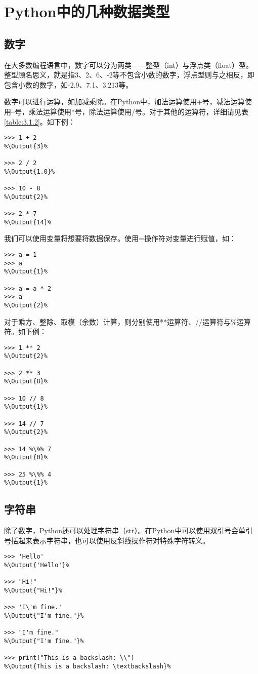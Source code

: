 \documentclass[../../Main.tex]{subfiles}
\begin{document}
\section{Python中的几种数据类型}
\subsection{数字}
在大多数编程语言中，数字可以分为两类——整型（int）与浮点类（float）型。整型顾名思义，就是指3、2、6、-2等不包含小数的数字，浮点型则与之相反，即包含小数的数字，如-2.9、7.1、3.213等。

数字可以进行运算，如加减乘除。在Python中，加法运算使用+号，减法运算使用--号，乘法运算使用*号，除法运算使用/号。对于其他的运算符，详细请见表\ref{table:3.1.2}。如下例：
\begin{lstlisting}
>>> 1 + 2
%\Output{3}%

>>> 2 / 2
%\Output{1.0}%

>>> 10 - 8
%\Output{2}%

>>> 2 * 7
%\Output{14}%
\end{lstlisting}

\begin{ExtraKnowledge}
    我们可以使用变量将想要将数据保存。使用=操作符对变量进行赋值，如：
    \begin{lstlisting}[numbers=none]
>>> a = 1
>>> a
%\Output{1}%

>>> a = a * 2
>>> a
%\Output{2}%
    \end{lstlisting}
\end{ExtraKnowledge}

对于乘方、整除、取模（余数）计算，则分别使用**运算符、//运算符与\%运算符。如下例：
\begin{lstlisting}
>>> 1 ** 2
%\Output{2}%

>>> 2 ** 3
%\Output{8}%

>>> 10 // 8
%\Output{1}%

>>> 14 // 7
%\Output{2}%

>>> 14 %\%% 7
%\Output{0}%

>>> 25 %\%% 4
%\Output{1}%
\end{lstlisting}

\subsection{字符串}
除了数字，Python还可以处理字符串（str）。在Python中可以使用双引号会单引号括起来表示字符串，也可以使用反斜线操作符对特殊字符转义。

\begin{lstlisting}
>>> 'Hello'
%\Output{'Hello'}%

>>> "Hi!"
%\Output{"Hi!"}%

>>> 'I\'m fine.'
%\Output{"I'm fine."}%

>>> "I'm fine."
%\Output{"I'm fine."}%

>>> print("This is a backslash: \\")
%\Output{This is a backslash: \textbackslash}%

\end{lstlisting}
\end{document}
